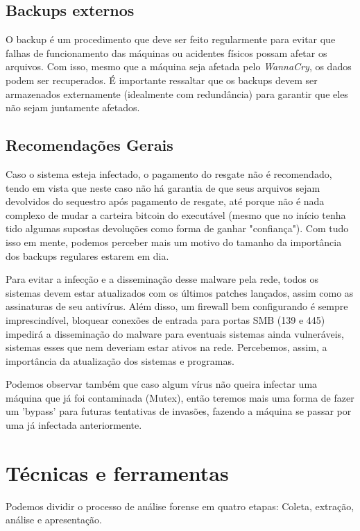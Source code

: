 \documentclass[12pt]{article}
\begin{document}
\subsection{Backups externos}

O backup é um procedimento que deve ser feito regularmente para evitar que falhas de funcionamento das máquinas ou acidentes físicos possam afetar os arquivos. Com isso, mesmo que a máquina seja afetada pelo \textit{WannaCry}, os dados podem ser recuperados. É importante ressaltar que os backups devem ser armazenados externamente (idealmente com redundância) para garantir que eles não sejam juntamente afetados.


\subsection{Recomendações Gerais}

Caso o sistema esteja infectado, o pagamento do resgate não é recomendado, tendo em vista que neste caso não há garantia de que seus arquivos sejam devolvidos do sequestro após pagamento de resgate, até porque não é nada complexo de mudar a carteira bitcoin do executável (mesmo que no início tenha tido algumas supostas devoluções como forma de ganhar "confiança"). Com tudo isso em mente, podemos perceber mais um motivo do tamanho da importância dos backups regulares estarem em dia.

Para evitar a infecção e a disseminação desse malware pela rede, todos os sistemas devem estar atualizados com os últimos patches lançados, assim como as assinaturas de seu antivírus. Além disso, um firewall bem configurando é sempre imprescindível, bloquear conexões de entrada para portas SMB (139 e 445) impedirá a disseminação do malware para eventuais sistemas ainda vulneráveis, sistemas esses que nem deveriam estar ativos na rede. Percebemos, assim, a importância da atualização dos sistemas e programas.

Podemos observar também que caso algum vírus não queira infectar uma máquina que já foi contaminada (Mutex), então teremos mais uma forma de fazer um 'bypass' para futuras tentativas de invasões, fazendo a máquina se passar por uma já infectada anteriormente.

\section{Técnicas e ferramentas}

Podemos dividir o processo de análise forense em quatro etapas:
Coleta, extração, análise e apresentação.
\end{document}
